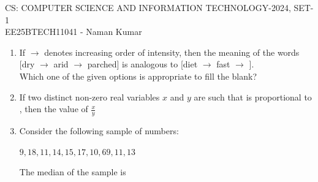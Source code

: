 \documentclass[a4paper, 11pt]{article}
\begin{document}
\begin{center}
    \huge{CS: COMPUTER SCIENCE AND INFORMATION TECHNOLOGY-2024, SET-1}\\
    \large{EE25BTECH11041 - Naman Kumar}
\end{center}


\begin{enumerate}
    \item If $\rightarrow$ denotes increasing order of intensity, then the meaning of the words [dry $\rightarrow$ arid $\rightarrow$ parched] is analogous to [diet $\rightarrow$ fast $\rightarrow$ \underline{\hspace{2cm}}].\\Which one of the given options is appropriate to fill the blank?
    \begin{enumerate}
    \end{enumerate}
    \hfill{}
    
    \item If two distinct non-zero real variables $x$ and $y$ are such that  is proportional to , then the value of $\frac{x}{y}$
    \begin{enumerate}
    \end{enumerate}
    \hfill{}
    
    \item Consider the following sample of numbers:
    
    $9, 18, 11, 14, 15, 17, 10, 69, 11, 13$
    
    The median of the sample is
    \begin{enumerate}
    \end{enumerate}
    \hfill{}
    

\end{enumerate}
\end{document}
